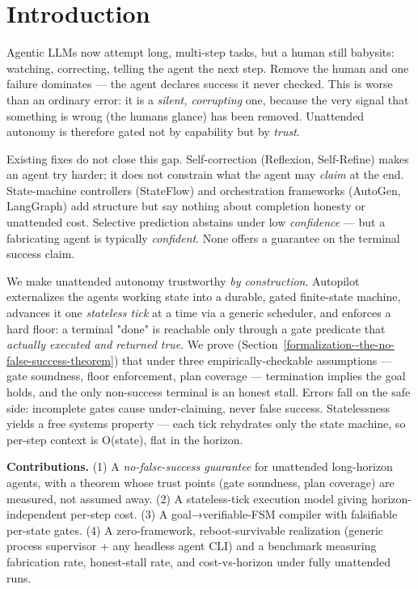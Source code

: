 \section{Introduction}\label{introduction}

Agentic LLMs now attempt long, multi-step tasks, but a human still babysits: watching, correcting,
telling the agent the next step. Remove the human and one failure dominates --- the agent declares
success it never checked. This is worse than an ordinary error: it is a \emph{silent, corrupting} one,
because the very signal that something is wrong (the human\textquotesingle s glance) has been removed. Unattended
autonomy is therefore gated not by capability but by \emph{trust}.

Existing fixes do not close this gap. Self-correction (Reflexion, Self-Refine) makes an agent try
harder; it does not constrain what the agent may \emph{claim} at the end. State-machine controllers
(StateFlow) and orchestration frameworks (AutoGen, LangGraph) add structure but say nothing about
completion honesty or unattended cost. Selective prediction abstains under low \emph{confidence} --- but a
fabricating agent is typically \emph{confident}. None offers a guarantee on the terminal success claim.

We make unattended autonomy trustworthy \emph{by construction}. Autopilot externalizes the agent\textquotesingle s working
state into a durable, gated finite-state machine, advances it one \emph{stateless tick} at a time via a
generic scheduler, and enforces a hard floor: a terminal "done" is reachable only through a gate
predicate that \emph{actually executed and returned true}. We prove (Section~\ref{formalization--the-no-false-success-theorem}) that under three
empirically-checkable assumptions --- gate soundness, floor enforcement, plan coverage --- termination
implies the goal holds, and the only non-success terminal is an honest stall. Errors fall on the safe
side: incomplete gates cause under-claiming, never false success. Statelessness yields a free systems
property --- each tick rehydrates only the state machine, so per-step context is O(state), flat in the horizon.

\textbf{Contributions.} (1) A \emph{no-false-success guarantee} for unattended long-horizon agents, with a theorem
whose trust points (gate soundness, plan coverage) are measured, not assumed away. (2) A stateless-tick
execution model giving horizon-independent per-step cost. (3) A goal→verifiable-FSM compiler with
falsifiable per-state gates. (4) A zero-framework, reboot-survivable realization (generic process
supervisor + any headless agent CLI) and a benchmark measuring fabrication rate, honest-stall rate,
and cost-vs-horizon under fully unattended runs.


